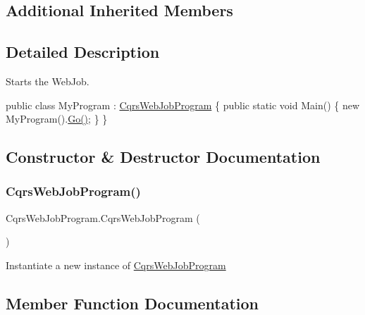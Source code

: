 \subsection*{Additional Inherited Members}


\subsection{Detailed Description}
Starts the Web\+Job. 

public class My\+Program \+: \hyperlink{classCqrsWebJobProgram}{Cqrs\+Web\+Job\+Program} \{ public static void Main() \{ new My\+Program().\hyperlink{classCqrsWebJobProgram_a6a4f817351105cb5482ebb7a30c34ebf_a6a4f817351105cb5482ebb7a30c34ebf}{Go()}; \} \} 

\subsection{Constructor \& Destructor Documentation}
\mbox{\label{classCqrsWebJobProgram_aef553539b5ec25d0cdb061fd9895c851_aef553539b5ec25d0cdb061fd9895c851}} 
\subsubsection{\texorpdfstring{Cqrs\+Web\+Job\+Program()}{CqrsWebJobProgram()}}
{\footnotesize\ttfamily Cqrs\+Web\+Job\+Program.\+Cqrs\+Web\+Job\+Program (\begin{DoxyParamCaption}{ }\end{DoxyParamCaption})}



Instantiate a new instance of \hyperlink{classCqrsWebJobProgram}{Cqrs\+Web\+Job\+Program} 



\subsection{Member Function Documentation}
\mbox{\label{classCqrsWebJobProgram_a2602ec293cadb25dbca9d63be1956818_a2602ec293cadb25dbca9d63be1956818}} 
